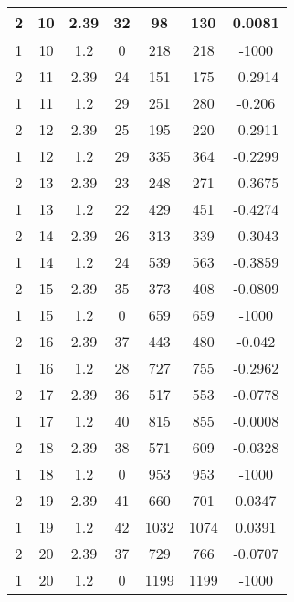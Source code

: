 \documentclass[letterpaper, 12pt]{article}
\begin{document}
\begin{longtable}{|c|c|c|c|c|c|c|}
\hline
2 & 10 & 2.39 & 32 & 98 & 130 & 0.0081 \\
\hline
1 & 10 & 1.2 & 0 & 218 & 218 & -1000 \\
\hline
2 & 11 & 2.39 & 24 & 151 & 175 & -0.2914 \\
\hline
1 & 11 & 1.2 & 29 & 251 & 280 & -0.206 \\
\hline
2 & 12 & 2.39 & 25 & 195 & 220 & -0.2911 \\
\hline
1 & 12 & 1.2 & 29 & 335 & 364 & -0.2299 \\
\hline
2 & 13 & 2.39 & 23 & 248 & 271 & -0.3675 \\
\hline
1 & 13 & 1.2 & 22 & 429 & 451 & -0.4274 \\
\hline
2 & 14 & 2.39 & 26 & 313 & 339 & -0.3043 \\
\hline
1 & 14 & 1.2 & 24 & 539 & 563 & -0.3859 \\
\hline
2 & 15 & 2.39 & 35 & 373 & 408 & -0.0809 \\
\hline
1 & 15 & 1.2 & 0 & 659 & 659 & -1000 \\
\hline
2 & 16 & 2.39 & 37 & 443 & 480 & -0.042 \\
\hline
1 & 16 & 1.2 & 28 & 727 & 755 & -0.2962 \\
\hline
2 & 17 & 2.39 & 36 & 517 & 553 & -0.0778 \\
\hline
1 & 17 & 1.2 & 40 & 815 & 855 & -0.0008 \\
\hline
2 & 18 & 2.39 & 38 & 571 & 609 & -0.0328 \\
\hline
1 & 18 & 1.2 & 0 & 953 & 953 & -1000 \\
\hline
2 & 19 & 2.39 & 41 & 660 & 701 & 0.0347 \\
\hline
1 & 19 & 1.2 & 42 & 1032 & 1074 & 0.0391 \\
\hline
2 & 20 & 2.39 & 37 & 729 & 766 & -0.0707 \\
\hline
1 & 20 & 1.2 & 0 & 1199 & 1199 & -1000 \\
\hline
\end{longtable}
\end{document}

